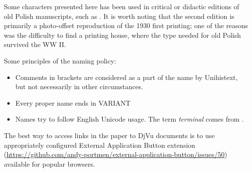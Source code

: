 \documentclass{article}
\begin{document}
 Some characters presented here has been used in critical or didactic
 editions of old Polish manuscripts, such as
 \autocite{vrtel-wierczyński50:_wybór}. It is worth noting that the
 second edition is primarily a photo-offset reproduction of the 1930
 first printing; one of the reasons was the difficulty to find a printing
 house, where the type needed for old Polish survived the WW II.
 
Some principles of the naming policy:
\begin{itemize}
\item Comments in brackets are considered as a part of the name by
  \textsf{Unihistext}, but not necessarily in other circumstances.
\item Every proper name ends in VARIANT
\item Names try to follow English Unicode usage. The term
  \textit{terminal} comes from
  \autocite{gaskell76:_nomec_letter_roman_type}.

\end{itemize}

The best way to access links in the paper to DjVu documents is to use
appropriately configured External Application Button extension
(\url{https://github.com/andy-portmen/external-application-button/issues/50})
available for popular browsers.
\end{document}
